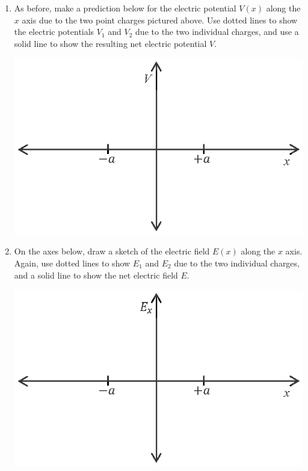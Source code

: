\begin{enumerate}[labparts]

\item As before, make a prediction below for the electric potential $V(x)$ along the $x$ axis due to the two point charges pictured above.  Use dotted lines to show the electric potentials $V_1$ and $V_2$ due to the two individual charges, and use a solid line to show the resulting net electric potential $V$.  
\begin{center}
\includegraphics{potential_superposition/activity_2_3_figs/V_axes.eps}
\end{center}

\item On the axes below, draw a sketch of the electric field $E(x)$ along the $x$ axis.  Again, use dotted lines to show $E_1$ and $E_2$ due to the two individual charges, and a solid line to show the net electric field $E$.
\begin{center}
\includegraphics{potential_superposition/activity_2_3_figs/E_axes.eps}
\end{center}


\end{enumerate}
